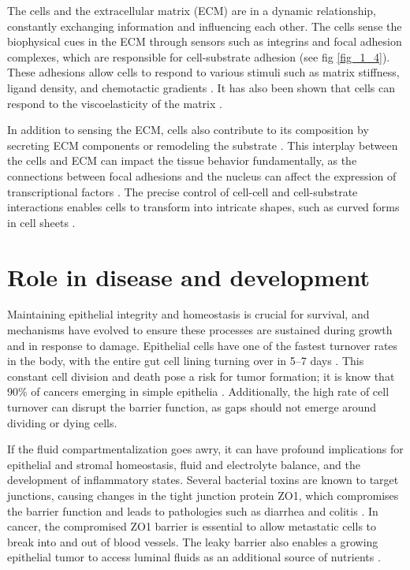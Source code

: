 The cells and the extracellular matrix (ECM) are in a dynamic relationship, constantly exchanging information and influencing each other. The cells sense the biophysical cues in the ECM through sensors such as integrins and focal adhesion complexes, which are responsible for cell-substrate adhesion \cite{kechagia2019} (see fig \ref{fig_1_4}). These adhesions allow cells to respond to various stimuli such as matrix stiffness, ligand density, and chemotactic gradients \cite{fortunato2022}. It has also been shown that cells can respond to the viscoelasticity of the matrix \cite{elosegui-artola2022}.

In addition to sensing the ECM, cells also contribute to its composition by secreting ECM components or remodeling the substrate \cite{malandrino2018}. This interplay between the cells and ECM can impact the tissue behavior fundamentally, as the connections between focal adhesions and the nucleus can affect the expression of transcriptional factors \cite{venturini2020, lomakin2020}. The precise control of cell-cell and cell-substrate interactions enables cells to transform into intricate shapes, such as curved forms in cell sheets \cite{schamberger2022}.

\hypertarget{role-in-disease-and-development}{%
	\section{Role in disease and
		development}\label{role-in-disease-and-development}}

Maintaining epithelial integrity and homeostasis is crucial for survival, and mechanisms have evolved to ensure these processes are sustained during growth and in response to damage. Epithelial cells have one of the fastest turnover rates in the body, with the entire gut cell lining turning over in 5--7 days \cite{barker2014}. This constant cell division and death pose a risk for tumor formation; it is know that 90\% of cancers emerging in simple epithelia \cite{torras2018, eisenhoffer2013}. Additionally, the high rate of cell turnover can disrupt the barrier function, as gaps should not emerge around dividing or dying cells.

If the fluid compartmentalization goes awry, it can have profound implications for epithelial and stromal homeostasis, fluid and electrolyte balance, and the development of inflammatory states. Several bacterial toxins are known to target junctions, causing changes in the tight junction protein ZO1, which compromises the barrier function and leads to pathologies such as diarrhea and colitis \cite{fasano1991}. In cancer, the compromised ZO1 barrier is essential to allow metastatic cells to break into and out of blood vessels. The leaky barrier also enables a growing epithelial tumor to access luminal fluids as an additional source of nutrients \cite{mullin2005}.

